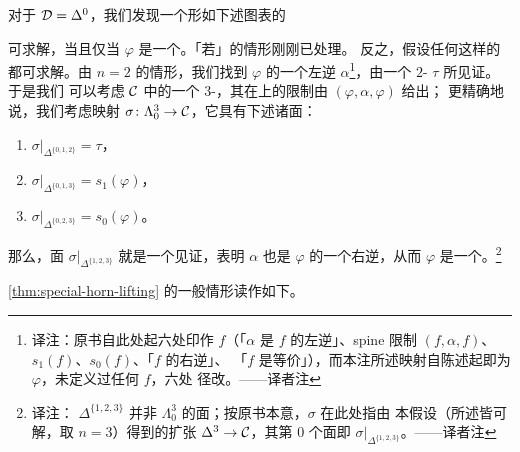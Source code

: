 \begin{remark}\label{rem:special-horn-criterion}
对于 $\mathcal{D} = \Delta^0$，我们发现一个形如下述图表的\trLiftingProblem{}%
\begin{center}
\end{center}
可求解，当且仅当 $\varphi$ 是一个\trEquivalence{}。「若」的情形刚刚已处理。
反之，假设任何这样的\trLiftingProblem{}都可求解。由 $n = 2$ 的情形，我们找到
$\varphi$ 的一个左逆 $\alpha$\footnote{译注：原书自此处起六处印作 $f$（「$\alpha$
是 $f$ 的左逆」、spine 限制 $(f,\alpha,f)$、$s_1(f)$、$s_0(f)$、「$f$ 的右逆」、
「$f$ 是等价」），而本注所述映射自陈述起即为 $\varphi$，未定义过任何 $f$，六处
径改。——译者注}，由一个 $2$-\trSimplex{} $\tau$ 所见证。于是我们
可以考虑 $\mathcal{C}$ 中的一个
$3$-\trHorn{}，其在\trSpine{}上的限制由 $(\varphi, \alpha, \varphi)$ 给出；
更精确地说，我们考虑映射 $\sigma\colon \Lambda^3_0 \to \mathcal{C}$，它具有下述诸面：
\begin{enumerate}[label=(\arabic*)]
  \item $\sigma|_{\Delta^{\{0,1,2\}}} = \tau$，
  \item $\sigma|_{\Delta^{\{0,1,3\}}} = s_1(\varphi)$，
  \item $\sigma|_{\Delta^{\{0,2,3\}}} = s_0(\varphi)$。
\end{enumerate}
那么，面 $\sigma|_{\Delta^{\{1,2,3\}}}$ 就是一个见证，表明 $\alpha$ 也是
$\varphi$ 的一个右逆，从而 $\varphi$ 是一个\trEquivalence{}。\footnote{译注：
$\Delta^{\{1,2,3\}}$ 并非 $\Lambda^3_0$ 的面；按原书本意，$\sigma$ 在此处指由
本假设（所述\trLiftingProblem{}皆可解，取 $n=3$）得到的扩张 $\Delta^3 \to \mathcal{C}$，其第
$0$ 个面即 $\sigma|_{\Delta^{\{1,2,3\}}}$。——译者注}
\end{remark}

\cref{thm:special-horn-lifting} 的一般情形读作如下。

